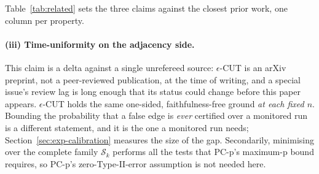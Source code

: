 \documentclass[pdflatex,sn-apa]{sn-jnl}
\theoremstyle{thmstyleone}%
\theoremstyle{thmstyletwo}%
\theoremstyle{thmstylethree}%
\newcommand{\Scal}{\mathcal{S}}
\begin{document}
Table~\ref{tab:related} sets the three claims against the closest prior work,
one column per property.

\paragraph{(iii) Time-uniformity on the adjacency side.} This claim is a delta
against a single unrefereed source: $\epsilon$-CUT \citep{shaska2025causal} is
an arXiv preprint, not a peer-reviewed publication, at the time of writing,
and a special issue's review lag is long enough that its status could change
before this paper appears. $\epsilon$-CUT holds the same one-sided,
faithfulness-free ground \emph{at each fixed $n$}. Bounding the probability
that a false edge is
\emph{ever} certified over a monitored run is a different statement, and it is
the one a monitored run needs; Section~\ref{sec:exp-calibration} measures the
size of the gap. Secondarily, minimising over the complete family $\Scal_k$
performs all the tests that PC-p's maximum-p bound requires, so PC-p's
zero-Type-II-error assumption is not needed here.
\end{document}
